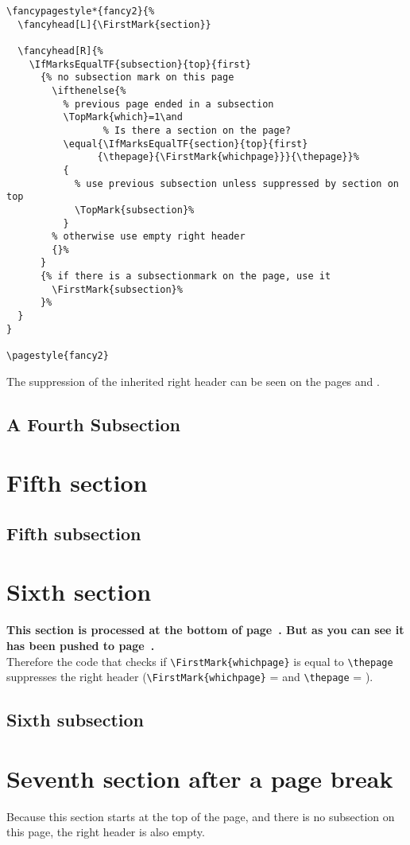 \documentclass{article}
\begin{document}
\begin{verbatim}
\fancypagestyle*{fancy2}{%
  \fancyhead[L]{\FirstMark{section}}

  \fancyhead[R]{%
    \IfMarksEqualTF{subsection}{top}{first}
      {% no subsection mark on this page
        \ifthenelse{%
          % previous page ended in a subsection
          \TopMark{which}=1\and
                 % Is there a section on the page?
          \equal{\IfMarksEqualTF{section}{top}{first}
                {\thepage}{\FirstMark{whichpage}}}{\thepage}}%
          {
            % use previous subsection unless suppressed by section on top
            \TopMark{subsection}%
          }
        % otherwise use empty right header
        {}%
      }
      {% if there is a subsectionmark on the page, use it
        \FirstMark{subsection}%
      }%
  }
}

\pagestyle{fancy2}
\end{verbatim}

The suppression of the inherited right header can be seen on the pages \pageref{sec:push} and \pageref{sec:newpage}.

\medskip

\lipsum[1-3]

\subsection{A Fourth Subsection}

\lipsum[8-11]

\section{Fifth section}

\lipsum[1-7]

\subsection{Fifth subsection}

\lipsum[8-17]

\section{Sixth section}
\label{sec:push}

{\bfseries This section is processed at the bottom of page~\thethispage. But as you can see it has been pushed to page~\pageref{sec:push}.}\\
Therefore the code that checks if \verb|\FirstMark{whichpage}| is equal to \verb|\thepage| suppresses the right header
(\verb|\FirstMark{whichpage}| = \thethispage{} and  \verb|\thepage| = \pageref{sec:push}).

\medskip

\lipsum[1-6]

\subsection{Sixth subsection}

\lipsum[7]

\newpage
\section{Seventh section after a page break}
\label{sec:newpage}

Because this section starts at the top of the page, and there is no subsection on this page, the right header is also empty.

\medskip

\lipsum[8-10]
\end{document}
